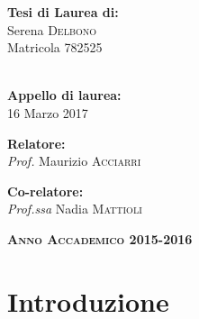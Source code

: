 \documentclass [a4paper,11pt]{book}
\begin{document}
\begin{flushright}
\textbf{Tesi di Laurea di:}\\
\hspace*{2em}Serena \textsc{Delbono}\\
\hspace*{2em}Matricola 782525

\textbf{ \\ Appello di laurea:}\\
\hspace*{2em}16 Marzo 2017
\end{flushright}
\vfill
\begin{flushleft}
\textbf{Relatore:}\\
\hspace*{2em}\textit{Prof.} Maurizio \textsc{Acciarri}
\end{flushleft}
\begin{flushleft}
\textbf{Co-relatore:}\\
\hspace*{2em}\textit{Prof.ssa} Nadia \textsc{Mattioli}\\
\end{flushleft}
\vskip 2cm

\begin{center}
\textsc{\textbf{Anno Accademico 2015-2016}}
\end{center}


\restoregeometry

\thispagestyle{empty}
\cleardoublepage
\newpage
\tableofcontents

\newpage
\listoffigures
\listoftables



\mainmatter
\chapter*{Introduzione}







\begin{appendices}

\end{appendices}

\begin{appendices}

\end{appendices}




\end{document}
